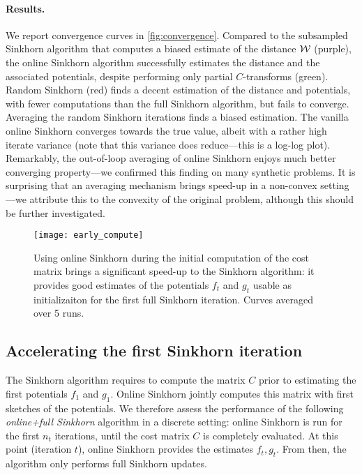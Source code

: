 \paragraph{Results.} We report convergence curves in \autoref{fig:convergence}.
Compared to the subsampled Sinkhorn algorithm that computes a biased estimate of
the distance $\mathcal{W}$ (purple), the online Sinkhorn algorithm successfully
estimates the distance and the associated potentials, despite performing only
partial $C$-transforms (green). Random Sinkhorn (red) finds a decent estimation
of the distance and potentials, with fewer computations than the full Sinkhorn
algorithm, but fails to converge. Averaging the random Sinkhorn iterations finds
a biased estimation. The vanilla online Sinkhorn converges towards the true
value, albeit with a rather high iterate variance (note that this variance does
reduce---this is a log-log plot). Remarkably, the out-of-loop averaging of
online Sinkhorn enjoys much better converging property---we confirmed this
finding on many synthetic problems. It is surprising that an averaging mechanism
brings speed-up in a non-convex setting---we attribute this to the convexity of
the original problem, although this should be further investigated.

\begin{figure}[t]
    \centering
    \texttt{[image: early\_compute]}
    \caption{Using online Sinkhorn during the initial computation of the cost
     matrix brings a significant speed-up to the Sinkhorn algorithm: it provides
     good estimates of the potentials $f_t$ and $g_t$ usable as initializaiton
     for the first full Sinkhorn iteration. Curves averaged over 5 runs. \label{fig:early_compute}}
\end{figure}

\subsection{Accelerating the first Sinkhorn iteration}\label{sec:accelerating}

The Sinkhorn algorithm requires to compute the matrix $C$ prior to estimating
the first potentials $f_1$ and $g_1$. Online Sinkhorn jointly computes this
matrix with first sketches of the potentials. We therefore assess the
performance of the following \textit{online+full Sinkhorn} algorithm in a
discrete setting: online Sinkhorn is run for the first $n_t$ iterations, until
the cost matrix $C$ is completely evaluated. At this point (iteration $t$),
online Sinkhorn provides the estimates $f_{t}, g_{t}$. From then, the algorithm
only performs full Sinkhorn updates.

